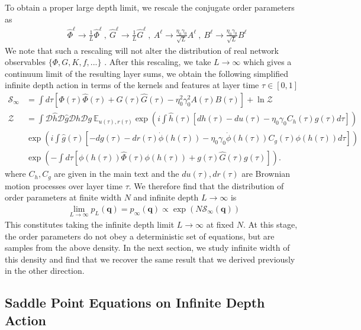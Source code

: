 \documentclass{article} %
\def\q{\bm q}
\begin{document}
To obtain a proper large depth limit, we rescale the conjugate order parameters as
\begin{align}
   &\hat\Phi^\ell \to \frac{1}{L} \hat\Phi^\ell
   \ , \ \hat G^\ell \to \frac{1}{L} \hat{G}^\ell
   \ , \ A^{\ell} \to \frac{\eta_0 \gamma_0}{\sqrt L} A^{\ell} \ , \ B^{\ell} \to \frac{\eta_0 \gamma_0}{\sqrt L} B^{\ell} 
\end{align}
We note that such a rescaling will not alter the distribution of real network observables $\{ \Phi,G, K, f, ... \}$ \citep{bordelon2022self, bordelon2023dynamics}. After this rescaling, we take $L \to \infty$ which gives a continuum limit of the resulting layer sums, we obtain the following simplified infinite depth action in terms of the kernels and features at layer time $\tau \in [0,1]$
\begin{align}
    \mathcal S_\infty &=   \int d\tau [ \Phi(\tau) \hat\Phi(\tau) + G(\tau) \hat G(\tau) - \eta_0^2 \gamma_0^2 A(\tau) B(\tau) ] + \ln \mathcal Z \nonumber
    \\
    \mathcal Z &= \int \mathcal D \hat{h} \mathcal D \hat{g} \mathcal D h \mathcal D g \ 
 \mathbb{E}_{u(\tau),r(\tau)} \exp\left( i \int \hat{h}(\tau)[dh(\tau) - du(\tau) - \eta_0 \gamma_0 C_h(\tau) g(\tau) d\tau ] \right) \nonumber
    \\
    &\exp\left( i \int \hat{g}(\tau)[- dg(\tau) - dr(\tau)\dot\phi(h(\tau)) - \eta_0 \gamma_0 \dot\phi(h(\tau)) C_g(\tau) \phi(h(\tau)) d\tau  ] \right) \nonumber
    \\
    &\exp\left( - \int d\tau [ \phi(h(\tau)) \hat\Phi(\tau) \phi(h(\tau)) + g(\tau) \hat{G}(\tau) g(\tau)  ] \right) .
\end{align}
where $C_h, C_g$ are given in the main text and the $du(\tau) , dr(\tau)$ are Brownian motion processes over layer time $\tau$. We therefore find that the distribution of order parameters at finite width $N$ and infinite depth $L\to\infty$ is
\begin{align}
    \lim_{L\to\infty} p_L(\q) = p_\infty(\q) \propto \exp\left( N \mathcal S_\infty(\q) \right)
\end{align}
This constitutes taking the infinite depth limit $L \to \infty$ at fixed $N$. At this stage, the order parameters do not obey a deterministic set of equations, but are samples from the above density. In the next section, we study infinite width of this density and find that we recover the same result that we derived previously in the other direction. 

\subsection{Saddle Point Equations on Infinite Depth Action}
\end{document}
